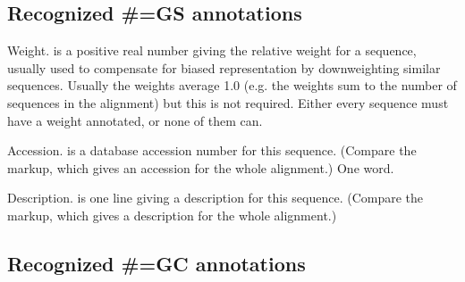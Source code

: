 \subsection{Recognized \#=GS annotations}

\begin{wideitem}
\item [\emprog{WT  <f>}]
        Weight.  is a positive real number giving the
        relative weight for a sequence, usually used to compensate
        for biased representation by downweighting similar sequences.   
        Usually the weights average 1.0 (e.g. the weights sum to
        the number of sequences in the alignment) but this is not
        required. Either every sequence must have a weight annotated, 
        or none of them can.  

\item [\emprog{AC  <s>}]
        Accession.  is a database accession number for 
        this sequence. (Compare the  markup, which gives
        an accession for the whole alignment.) One word. 
        
\item [\emprog{DE  <s>}]
        Description.  is one line giving a description for
        this sequence. (Compare the  markup, which gives
        a description for the whole alignment.)
\end{wideitem}


\subsection{Recognized \#=GC annotations}

